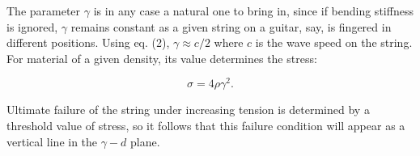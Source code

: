   The parameter $\gamma$ is in any case a natural one to bring in, since if 
  bending stiffness is ignored, $\gamma$ remains constant as a given string on 
  a guitar, say, is fingered in different positions. Using eq. (2), $\gamma 
  \approx c/2$ where $c$ is the wave speed on the string. For material of a 
  given density, its value determines the stress: 

  \begin{equation*}\sigma = 4 \rho \gamma^2. \tag{5}\end{equation*} 

  Ultimate failure of the string under increasing tension is determined by a 
  threshold value of stress, so it follows that this failure condition will 
  appear as a vertical line in the $\gamma-d$ plane. 